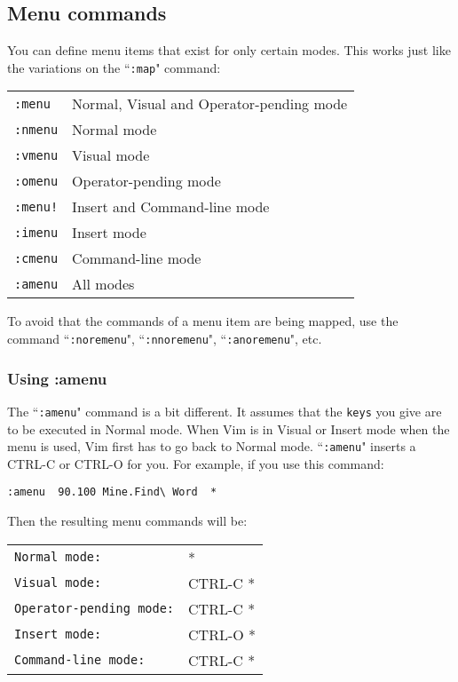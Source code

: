 \subsection{Menu commands}

You can define menu items that exist for only certain modes.
This works just like the variations on the ``\texttt{:map}" command:
\begin{center} \begin{tabular}{l l}
				\texttt{:menu} & Normal, Visual and Operator-pending mode \\
				\texttt{:nmenu} & Normal mode \\
				\texttt{:vmenu} & Visual mode \\
				\texttt{:omenu} & Operator-pending mode \\
				\texttt{:menu!} & Insert and Command-line mode \\
				\texttt{:imenu} & Insert mode \\
				\texttt{:cmenu} & Command-line mode \\
				\texttt{:amenu} & All modes \\
\end{tabular} \end{center}
To avoid that the commands of a menu item are being mapped, use the command ``\texttt{:noremenu}", ``\texttt{:nnoremenu}", ``\texttt{:anoremenu}", etc.

\subsubsection{Using :amenu}
The ``\texttt{:amenu}" command is a bit different.
It assumes that the \texttt{{keys}} you give are to be executed in Normal mode.
When Vim is in Visual or Insert mode when the menu is used, Vim first has to go back to Normal mode.
``\texttt{:amenu}" inserts a CTRL-C or CTRL-O for you.
For example, if you use this command:

\begin{Verbatim}[samepage=true]
 :amenu  90.100 Mine.Find\ Word  *
\end{Verbatim}

Then the resulting menu commands will be:

\begin{center} \begin{tabular}{l l}
				\texttt{Normal mode:} & * \\
				\texttt{Visual mode:} & CTRL-C * \\
				\texttt{Operator-pending mode:} & CTRL-C * \\
				\texttt{Insert mode:} & CTRL-O * \\
				\texttt{Command-line mode:} & CTRL-C * \\
\end{tabular} \end{center}

